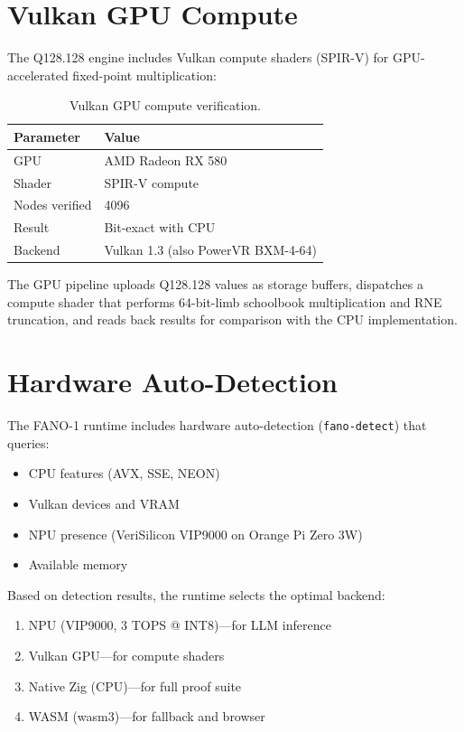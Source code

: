 \documentclass[11pt]{article}
\begin{document}
\section{Vulkan GPU Compute}

The Q128.128 engine includes Vulkan compute shaders (SPIR-V) for GPU-accelerated fixed-point multiplication:

\begin{table}[ht]
\centering
\caption{Vulkan GPU compute verification.}
\label{tab:vulkan}
\begin{tabular}{ll}
\toprule
Parameter & Value \\
\midrule
GPU & AMD Radeon RX 580 \\
Shader & SPIR-V compute \\
Nodes verified & 4096 \\
Result & Bit-exact with CPU \\
Backend & Vulkan 1.3 (also PowerVR BXM-4-64) \\
\bottomrule
\end{tabular}
\end{table}

The GPU pipeline uploads Q128.128 values as storage buffers, dispatches a compute shader that performs 64-bit-limb schoolbook multiplication and RNE truncation, and reads back results for comparison with the CPU implementation.

\section{Hardware Auto-Detection}

The FANO-1 runtime includes hardware auto-detection (\texttt{fano-detect}) that queries:
\begin{itemize}
\item CPU features (AVX, SSE, NEON)
\item Vulkan devices and VRAM
\item NPU presence (VeriSilicon VIP9000 on Orange Pi Zero 3W)
\item Available memory
\end{itemize}

Based on detection results, the runtime selects the optimal backend:
\begin{enumerate}
\item NPU (VIP9000, 3 TOPS @ INT8)---for LLM inference
\item Vulkan GPU---for compute shaders
\item Native Zig (CPU)---for full proof suite
\item WASM (wasm3)---for fallback and browser
\end{enumerate}
\end{document}

